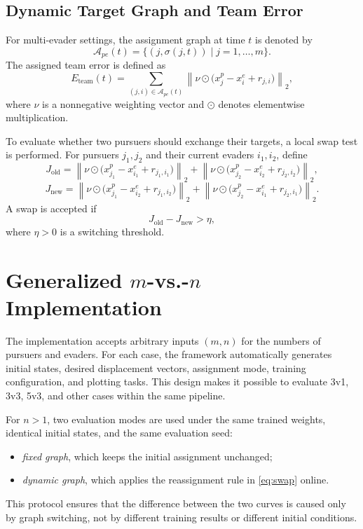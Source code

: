 ﻿\documentclass[conference]{IEEEtran}
\begin{document}
\subsection{Dynamic Target Graph and Team Error}
For multi-evader settings, the assignment graph at time $t$ is denoted by
\begin{equation}
\mathcal{A}_{pe}(t)=\{(j,\sigma(j,t))\mid j=1,\ldots,m\}.
\end{equation}
The assigned team error is defined as
\begin{equation}
E_{\text{team}}(t)=\sum_{(j,i)\in \mathcal{A}_{pe}(t)}\left\|\nu\odot\big(x_j^p-x_i^e+r_{j,i}\big)\right\|_2,
\label{eq:eteam}
\end{equation}
where $\nu$ is a nonnegative weighting vector and $\odot$ denotes elementwise multiplication.

To evaluate whether two pursuers should exchange their targets, a local swap test is performed. For pursuers $j_1,j_2$ and their current evaders $i_1,i_2$, define
\begin{equation}
J_{\text{old}}=
\left\|\nu\odot\big(x_{j_1}^p-x_{i_1}^e+r_{j_1,i_1}\big)\right\|_2+
\left\|\nu\odot\big(x_{j_2}^p-x_{i_2}^e+r_{j_2,i_2}\big)\right\|_2,
\end{equation}
\begin{equation}
J_{\text{new}}=
\left\|\nu\odot\big(x_{j_1}^p-x_{i_2}^e+r_{j_1,i_2}\big)\right\|_2+
\left\|\nu\odot\big(x_{j_2}^p-x_{i_1}^e+r_{j_2,i_1}\big)\right\|_2.
\end{equation}
A swap is accepted if
\begin{equation}
J_{\text{old}}-J_{\text{new}}>\eta,
\label{eq:swap}
\end{equation}
where $\eta>0$ is a switching threshold.

\section{Generalized $m$-vs.-$n$ Implementation}
The implementation accepts arbitrary inputs $(m,n)$ for the numbers of pursuers and evaders. For each case, the framework automatically generates initial states, desired displacement vectors, assignment mode, training configuration, and plotting tasks. This design makes it possible to evaluate 3v1, 3v3, 5v3, and other cases within the same pipeline.

For $n>1$, two evaluation modes are used under the same trained weights, identical initial states, and the same evaluation seed:
\begin{itemize}
    \item \textit{fixed graph}, which keeps the initial assignment unchanged;
    \item \textit{dynamic graph}, which applies the reassignment rule in \eqref{eq:swap} online.
\end{itemize}
This protocol ensures that the difference between the two curves is caused only by graph switching, not by different training results or different initial conditions.
\end{document}

